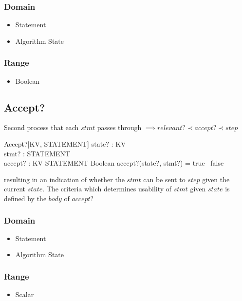 \documentclass[../main.tex]{subfiles}
\begin{document}
\subsubsection{Domain}

\begin{itemize}
\item Statement
\item Algorithm State
\end{itemize}

\subsubsection{Range}

\begin{itemize}
\item Boolean
\end{itemize}

\subsection{Accept?}

Second process that each $stmt$ passes through $\implies relevant? \prec accept? \prec step$
\begin{schema}{Accept?[KV, STATEMENT]}
  state? : KV \\
  stmt? : STATEMENT \\
  accept? : KV \cross STATEMENT \fun Boolean
  \where
  accept?(state?, stmt?) = true ~\lor false
\end{schema}
resulting in an indication of whether the $stmt$ can be sent to $step$ given the current $state$.
The criteria which determines usability of $stmt$ given $state$ is defined by the $body$ of $accept?$


\subsubsection{Domain}

\begin{itemize}
\item Statement
\item Algorithm State
\end{itemize}

\subsubsection{Range}

\begin{itemize}
\item Scalar
\end{itemize}
\end{document}
